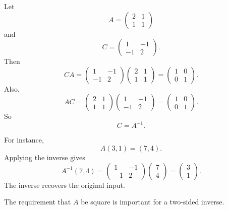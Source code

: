 \begin{example}
Let
\[
    A=
    \begin{pmatrix}
        2&1\\
        1&1
    \end{pmatrix}
\]
and
\[
    C=
    \begin{pmatrix}
        1&-1\\
        -1&2
    \end{pmatrix}.
\]
Then
\[
    CA=
    \begin{pmatrix}
        1&-1\\
        -1&2
    \end{pmatrix}
    \begin{pmatrix}
        2&1\\
        1&1
    \end{pmatrix}
    =
    \begin{pmatrix}
        1&0\\
        0&1
    \end{pmatrix}.
\]
Also,
\[
    AC=
    \begin{pmatrix}
        2&1\\
        1&1
    \end{pmatrix}
    \begin{pmatrix}
        1&-1\\
        -1&2
    \end{pmatrix}
    =
    \begin{pmatrix}
        1&0\\
        0&1
    \end{pmatrix}.
\]
So
\[
    C=A^{-1}.
\]

For instance,
\[
    A(3,1)=(7,4).
\]
Applying the inverse gives
\[
    A^{-1}(7,4)
    =
    \begin{pmatrix}
        1&-1\\
        -1&2
    \end{pmatrix}
    \begin{pmatrix}7\\4\end{pmatrix}
    =
    \begin{pmatrix}3\\1\end{pmatrix}.
\]
The inverse recovers the original input.
\end{example}

The requirement that \(A\) be square is important for a two-sided inverse.

